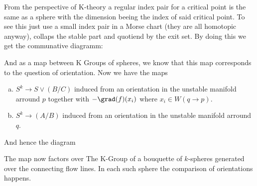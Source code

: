 \begin{Iprove}
	From the perspective of K-theory a regular index pair for a critical point is the same as a sphere with the dimension beeing the index of said critical point. To see this just use a small index pair in a Morse chart (they are all homotopic anyway), collaps the stable part and quotiend by the exit set. By doing this we get the communative diagramm:
	\begin{center}
	\end{center} And as a map between K Groups of spheres, we know that this map corresponds to the question of orientation. Now we have the maps 
	\begin{enumerate}[(a)]
		\item $S^k\to S\vee (B\big/ C)$ induced from an orientation in the unstable manifold arround $p$ together with $-\grad(f)(x_i)$ where $x_i\in W(q\to p)$. 
		\item $S^k \to (A\big/ B)$ induced from an orientation in the unstable manifold arround $q$. 
	\end{enumerate}
	And hence the diagram 
	\begin{center}
	\end{center}
	The map now factors over The K-Group of a bouquette of $k$-spheres generated over the connecting flow lines. In each such sphere the comparison of orientations happens.
\end{Iprove}


